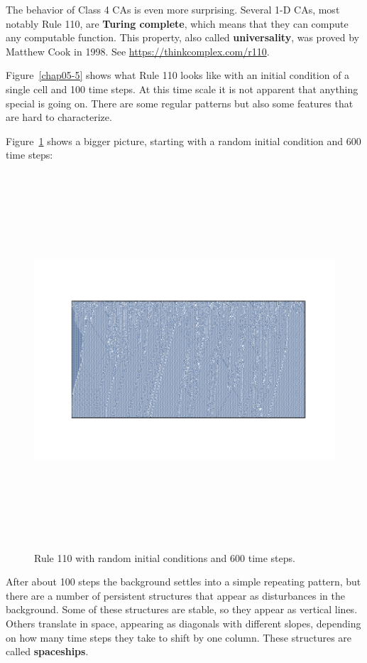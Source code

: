 \documentclass[12pt]{book}
\theoremstyle{exercise}
\begin{document}
The behavior of Class 4 CAs is even more surprising.  Several 1-D CAs,
most notably Rule 110, are {\bf Turing complete}, which means that
they can compute any computable function.  This property, also called
{\bf universality}, was proved by Matthew Cook in 1998.  See
\url{https://thinkcomplex.com/r110}.


Figure~\ref{chap05-5} shows what Rule 110 looks like with an initial
condition of a single cell and 100 time steps.
At this time scale it is not apparent that anything special is
going on.  There are some regular patterns but also some features
that are hard to characterize.


Figure~\ref{chap05-6} shows a bigger picture, starting with a random
initial condition and 600 time steps:

\begin{figure}
\centerline{\includegraphics[width=5.5in,height=5.5in]{figs/chap05-6.pdf}}
\caption{Rule 110 with random initial conditions and 600 time steps.}
\label{chap05-6}
\end{figure}

After about 100 steps the background settles into a simple repeating
pattern, but there are a number of persistent structures that appear
as disturbances in the background.  Some of these structures
are stable, so they appear as vertical lines.  Others translate in
space, appearing as diagonals with different slopes, depending on
how many time steps they take to shift by one column.  These
structures are called {\bf spaceships}.
\end{document}
